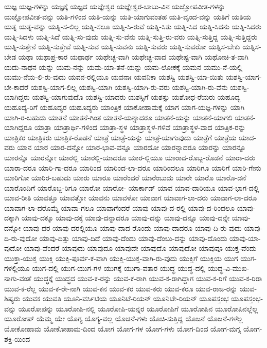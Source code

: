{ಯಜ್ಞ
ಯಜ್ಞ-ಗಳನ್ನು
ಯಜ್ಞಕ್ಕೆ
ಯಜ್ಞದ
ಯಜ್ಞೇಶ್ವರ
ಯಜ್ಞೇಶ್ವರ-ಬಾಬು-ವಿನ
ಯಜ್ಞೋಪವೀತ-ಗಳನ್ನು
ಯಜ್ಞೋಪವೀತ-ವನ್ನು
ಯತಿ-ಗಳಿಂದ
ಯತಿ-ಯನ್ನು
ಯತಿ-ಯಾಗುವಂತಹ
ಯತಿ-ವೃಂದ-ವನ್ನು
ಯತಿಗೆ
ಯತಿಯ
ಯತ್ನ
ಯತ್ನ-ವನ್ನು
ಯತ್ನಿ-ಸ-ಲಿಲ್ಲ
ಯತ್ನಿ-ಸಲೂ
ಯತ್ನಿ-ಸಿ-ರುವೆ
ಯತ್ನಿ-ಸಿತು
ಯತ್ನಿ-ಸಿದ
ಯತ್ನಿ-ಸಿದನು
ಯತ್ನಿ-ಸಿದರು
ಯತ್ನಿ-ಸಿದಳು
ಯತ್ನಿ-ಸಿದೆ
ಯತ್ನಿ-ಸು-ವುದು
ಯತ್ನಿ-ಸು-ವೆನು
ಯತ್ನಿ-ಸುತ್ತಿ-ರು-ವರು
ಯತ್ನಿ-ಸುತ್ತಿದ್ದ
ಯತ್ನಿ-ಸುತ್ತಿದ್ದರು
ಯತ್ನಿ-ಸುತ್ತೇನೆ
ಯತ್ನಿ-ಸುತ್ತೇವೆ
ಯತ್ನಿ-ಸುವ
ಯತ್ನಿ-ಸುವನು
ಯತ್ನಿ-ಸುವರು
ಯತ್ನಿ-ಸುವರೋ
ಯತ್ನಿಸ-ಬೇಕು
ಯತ್ನಿಸ-ಬೇಡ
ಯಥಾ
ಯಥಾಪ್ರ-ಕಾರ
ಯಥಾರ್ಥ
ಯಥೇಚ್ಛ-ವಾಗಿ
ಯಥೇಚ್ಛ-ವಾದ
ಯಥೇಷ್ಟ-ವಾಗಿ
ಯಥೋಚಿ-ತ-ವಾಗಿ
ಯದು-ನಾಥನ
ಯನ್ನು
ಯಮ-ನನ್ನು
ಯಮ-ಯಾ-ತನೆ-ಯನ್ನು
ಯಮ-ಲೋಕಕ್ಕೆ
ಯಮನ
ಯಮು-ನೆ-ಯಲ್ಲಿ
ಯಮು-ನೆಯ-ಲಿ-ರು-ವುದು
ಯವನ-ರಲ್ಲಿಯೂ
ಯವನಾಃ
ಯವನಿಕಾ
ಯಶಸ್ವಿ
ಯಶಸ್ವಿ-ಯಾ-ಯಿತು
ಯಶಸ್ವಿ-ಯಾಗ-ಬೇ-ಕಾದರೆ
ಯಶಸ್ವಿ-ಯಾಗ-ಲಿಲ್ಲ
ಯಶಸ್ವಿ-ಯಾಗಿ
ಯಶಸ್ವಿ-ಯಾಗಿ-ರು-ವರು
ಯಶಸ್ವಿ-ಯಾಗಿ-ರು-ವೆನು
ಯಶಸ್ವಿ-ಯಾಗಿದ್ದರು
ಯಶಸ್ವಿ-ಯಾಗುವುದೊ
ಯಶಸ್ವಿ-ಯಾದರು
ಯಶಸ್ಸಿಗೆ
ಯಶಸ್ಸು
ಯಶೋಧ-ರೆಯರು
ಯಹೂದ್ಯ
ಯಹೂದ್ಯ-ರಿಗೆ
ಯಹೂದ್ಯರ
ಯಹೂದ್ಯರು
ಯಾಂತ್ರಿಕ
ಯಾಕೋಹಾಮಕ್ಕೆ
ಯಾಗ
ಯಾಗ-ಯಜ್ಞ-ಗಳನ್ನು
ಯಾಗಿ
ಯಾಗಿ-ರ-ಬಹುದು
ಯಾತನೆ
ಯಾತನೆ-ಗಿಂತ
ಯಾತನೆ-ಯನ್ನಾದರೂ
ಯಾತನೆ-ಯನ್ನು
ಯಾತನೆ-ಯಾಗಲಿ
ಯಾತನೆ-ಯಾಗಿದ್ದರೂ
ಯಾತ್ರಾ
ಯಾತ್ರಾರ್ಥಿ-ಗಳಿಂದ
ಯಾತ್ರಾ-ಸ್ಥಳ
ಯಾತ್ರಾಸ್ಥಳ-ಗಳಿವೆ
ಯಾತ್ರಾಸ್ಥಳ-ವಾದ
ಯಾತ್ರಿಕ-ರನ್ನು
ಯಾತ್ರಿಕರ
ಯಾತ್ರಿಕರು
ಯಾತ್ರಿಕ-ರೊಡನೆ
ಯಾತ್ರೆ
ಯಾತ್ರೆ-ಯನ್ನು
ಯಾತ್ರೆ-ಯಾಗುವುದು
ಯಾತ್ರೆಗೆ
ಯಾತ್ರೆಯ
ಯಾದ-ವರು
ಯಾನ
ಯಾರ
ಯಾರ-ದನ್ನೋ
ಯಾರ-ಭಾವ-ವನ್ನೂ
ಯಾರದೋ
ಯಾರನ್ನಾದರೂ
ಯಾರನ್ನು
ಯಾರನ್ನೂ
ಯಾರನ್ನೊ
ಯಾರನ್ನೋ
ಯಾರಲ್ಲಿ
ಯಾರಲ್ಲಿ-ಯಾದರೂ
ಯಾರ-ಲ್ಲಿಯೂ
ಯಾರಾದ-ರೊಬ್ಬ-ರೊಡನೆ
ಯಾರಾ-ದರು
ಯಾರಾ-ದರೂ
ಯಾರಿ-ಗಾ-ದರೂ
ಯಾರಿಂದ
ಯಾರಿಂದ-ಲಾ-ದರೂ
ಯಾರಿಂದಲೂ
ಯಾರಿಗೂ
ಯಾರಿಗೆ
ಯಾರಿ-ಗೇನು
ಯಾರಿಗೋ
ಯಾರಿರ-ಬಹುದು
ಯಾರು
ಯಾರೂ
ಯಾರೆಂದರೆ
ಯಾರೆಂಬುದು
ಯಾರೇ
ಯಾರೊ
ಯಾರೊ-ಡನೆ
ಯಾರೊಂದಿಗೆ
ಯಾರೊಬ್ಬ-ರಿಗೂ
ಯಾರೋ
ಯಾರೋ-
ಯಾರ್ಕಾಡ್
ಯಾವ
ಯಾವ-ದಾರಿಯೂ
ಯಾವ-ಭಾಗ-ದಲ್ಲಿ
ಯಾವ-ರೀತಿ
ಯಾವತ್ತೂ
ಯಾವತ್ತೋ
ಯಾವನು
ಯಾವಳೋ
ಯಾವಾಗ
ಯಾವಾಗ-ಲಾ-ದರು
ಯಾವಾಗ-ಲಾ-ದರೂ
ಯಾವಾಗ-ಲಾ-ದರೊಮ್ಮೆ
ಯಾವಾ-ಗಲೂ
ಯಾವಾಗೆಂದರೆ
ಯಾವು
ಯಾವು-ದ-ರಲ್ಲಿ
ಯಾವು-ದ-ರಿಂದಲೂ
ಯಾವು-ದಕ್ಕಾಗಿ
ಯಾವು-ದಕ್ಕೂ
ಯಾವು-ದಕ್ಕೆ
ಯಾವು-ದನ್ನಾದರೂ
ಯಾವು-ದನ್ನು
ಯಾವು-ದನ್ನೂ
ಯಾವು-ದನ್ನೇ
ಯಾವು-ದನ್ನೋ
ಯಾವು-ದರ
ಯಾವು-ದರಲ್ಲಿಯೂ
ಯಾವು-ದಾದ-ರೊಂದು
ಯಾವು-ದಾದರೂ
ಯಾವು-ದಿ-ರು-ವುದು
ಯಾವು-ದಿ-ರು-ವುದೋ
ಯಾವು-ದಿತ್ತು
ಯಾವು-ದಿದೆ
ಯಾವು-ದೆಂದು
ಯಾವು-ದೆಂಬು-ದನ್ನು
ಯಾವು-ದೊಂದು
ಯಾವು-ಯಾ-ವುದೋ
ಯಾವು-ವೆಂದರೆ
ಯಾವುದು
ಯಾವುದೂ
ಯಾವುದೇ
ಯಾವುದೊ
ಯಾವುದೋ
ಯಾವುವೂ
ಯುಕ್ತ-ವೆಂದು
ಯುಕ್ತಾ-ಯುಕ್ತ
ಯುಕ್ತಿ
ಯುಕ್ತಿ-ಪೂರ್ವ-ಕ-ವಾಗಿ
ಯುಕ್ತಿ-ಯುಕ್ತ-ವಾಗಿ-ರು-ವುದು
ಯುಕ್ತಿಗೆ
ಯುಕ್ತಿಯ
ಯುಗ
ಯುಗ-ಗಳಲ್ಲಿಯೂ
ಯುಗ-ದಲ್ಲಿ
ಯುಗ-ಯುಗ-ಗಳ
ಯುಗಕ್ಕೆ
ಯುಗಾ-ವತಾರ
ಯುದ್ಧ
ಯುದ್ಧ-ದಲ್ಲಿ
ಯುದ್ಧ-ವಿ-ಮುಖ-ನಾಗು-ವಂತೆ
ಯುದ್ಧಕ್ಕೆ
ಯುದ್ಧದ
ಯುವ-ಕ-ರನ್ನು
ಯುವ-ಕ-ರಾಗಿ
ಯುವ-ಕ-ರಾಗಿದ್ದಾಗ
ಯುವ-ಕ-ರಿಗೆ
ಯುವ-ಕ-ರಿರಾ
ಯುವ-ಕ-ರೆಲ್ಲ
ಯುವ-ಕ-ರೇ-ನಾಗಿ
ಯುವ-ಕನ
ಯುವ-ಕರ
ಯುವ-ಕರು
ಯುವ-ಕರೂ
ಯುವ-ರಾಜ-ರನ್ನು
ಯುವ-ಶಿಷ್ಯರು
ಯುವಕ
ಯುವತಿ
ಯೂನಿ-ವರ್ಸಿಟಿಯ
ಯೂನಿಟೆ-ರಿಯನ್
ಯೂನಿಟೇ-ರಿಯನ್
ಯೂಪಸ್ತಂಭ
ಯೂಪಸ್ತಂಭ-ವನ್ನು
ಯೂರೋಪನ್ನು
ಯೂರೋಪಿ-ನಲ್ಲಿ
ಯೂರೋಪಿ-ಯನ್ನರ
ಯೂರೋಪಿಗೆ
ಯೂರೋಪಿನ
ಯೂರೋಪಿನಲ್ಲೆಲ್ಲ
ಯೂರೋಪ್
ಯೆಮ್ಮ
ಯೇ
ಯೊಗ್ಯ
ಯೊಗ್ಯ-ವಲ್ಲ
ಯೊಚನೆ-ಗಳು
ಯೊಚಿ-ಸುತ್ತಿದ್ದ
ಯೊಜನೆ
ಯೊಜನೆ-ಗಳೆಲ್ಲ
ಯೋಕೋಹಾಮ
ಯೋಕೋಹಾಮ-ದಿಂದ
ಯೋಗ
ಯೋಗ-ಗಳ
ಯೋಗ-ಗಳು
ಯೋಗ-ದಿಂದ
ಯೋಗ-ಮಗ್ನ
ಯೋಗ-ಶಕ್ತಿ-ಯಿಂದ
}
